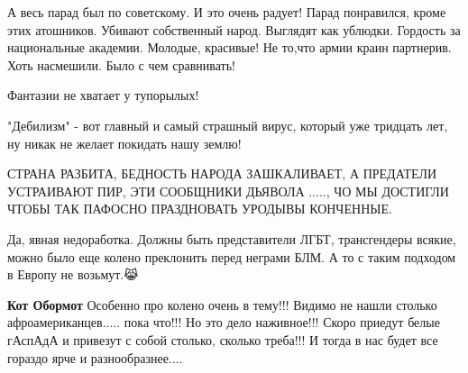 \begin{itemize}
А весь парад был по советскому. И это очень радует! Парад понравился, кроме
этих атошников. Убивают собственный народ. Выглядят как ублюдки. Гордость за
национальные академии. Молодые, красивые! Не то,что армии краин партнерив. Хоть
насмешили. Было с чем сравнивать!


 
Фантазии не хватает у тупорылых!

 
"Дебилизм" - вот главный и самый страшный вирус, который уже тридцать лет, ну никак не желает покидать нашу землю!

 

СТРАНА РАЗБИТА, БЕДНОСТЬ НАРОДА ЗАШКАЛИВАЕТ, А ПРЕДАТЕЛИ УСТРАИВАЮТ ПИР, ЭТИ
СООБЩНИКИ ДЬЯВОЛА ....., ЧО МЫ ДОСТИГЛИ ЧТОБЫ ТАК ПАФОСНО ПРАЗДНОВАТЬ УРОДЫВЫ
КОНЧЕННЫЕ.

 

Да, явная недоработка. Должны быть представители ЛГБТ, трансгендеры всякие,
можно было еще колено преклонить перед неграми БЛМ. А то с таким подходом в
Европу не возьмут.😹🐾

\begin{itemize}
 
\textbf{Кот Обормот} Особенно про колено очень в тему!!!
Видимо не нашли столько афроамериканцев..... пока что!!!
Но это дело наживное!!!
Скоро приедут белые гАспАдА и привезут с собой столько, сколько треба!!! И тогда в нас будет все гораздо ярче и разнообразнее....
\end{itemize}


\end{itemize}
